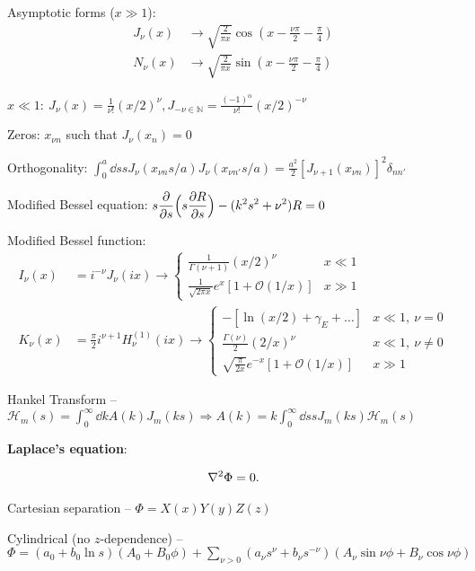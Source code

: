 Asymptotic forms ($x \gg 1$):
\begin{align}
    J_{\nu}(x) &\rightarrow \sqrt{\frac{2}{\pi x}} \cos( x - \frac{\nu \pi}{2} - \frac{\pi}{4} ) \\
    N_{\nu}(x) &\rightarrow \sqrt{\frac{2}{\pi x}} \sin(x - \frac{\nu \pi}{2} - \frac{\pi}{4})
\end{align}

$\displaystyle x \ll 1:~J_{\nu}(x) = \frac{1}{\nu!} (x/2)^{\nu},J_{-\nu\in\mathbb{N}} = \frac{(-1)^{\alpha}}{\nu!} (x/2)^{-\nu}$

Zeros: $x_{\nu n}$ such that $J_{\nu}(x_{n}) = 0$

Orthogonality: $\displaystyle \int_{0}^{a} \dd{s} s J_{\nu}( x_{\nu n} s / a ) J_{\nu}(x_{\nu n'} s / a) = \frac{a^2}{2} [J_{\nu+1}(x_{\nu n})]^2 \delta_{nn'}$

Modified Bessel equation: $\displaystyle s \pdv{s} \Big( s \pdv{R}{s} \Big) - (k^2 s^2 + \nu^2) R = 0$

Modified Bessel function:
\begin{align}
    I_{\nu}(x) &= i^{-\nu} J_{\nu}(ix) \rightarrow \begin{cases}
        \frac{1}{\Gamma(\nu+1)} (x/2)^{\nu} & x \ll 1 \\
        \frac{1}{\sqrt{2 \pi x}} e^{x} [ 1 + \mathcal{O}(1/x) ] & x \gg 1
    \end{cases} \\
        K_{\nu}(x) &= \frac{\pi}{2} i^{\nu+1} H_{\nu}^{(1)}(ix) \rightarrow \begin{cases}
        -[ \ln(x/2) + \gamma_E + \ldots ] & x \ll 1,~\nu = 0 \\
        \frac{\Gamma(\nu)}{2} (2/x)^{\nu} & x \ll 1,~\nu \ne 0 \\
        \sqrt{\frac{\pi}{2x}} e^{-x} [ 1 + \mathcal{O}(1/x) ] & x \gg 1
    \end{cases}
\end{align}

Hankel Transform -- $\displaystyle \mathcal{H}_{m}(s) = \int_{0}^{\infty} \dd{k} A(k) J_{m}(ks) \Rightarrow A(k) = k \int_{0}^{\infty} \dd{s} s J_{m}(ks) \mathcal{H}_{m}(s)$

\textbf{ Laplace's equation}:

\begin{eqnarray}
    \laplacian \Phi = 0
.\end{eqnarray}

Cartesian separation -- $\Phi = X(x) Y(y) Z(z)$

Cylindrical (no $z$-dependence) -- $\displaystyle \Phi = (a_0 + b_0 \ln{s})(A_0 + B_0 \phi) + \sum_{\nu > 0} (a_{\nu} s^{\nu} + b_{\nu} s^{-\nu}) (A_{\nu} \sin{\nu \phi} + B_{\nu} \cos{\nu \phi})$


